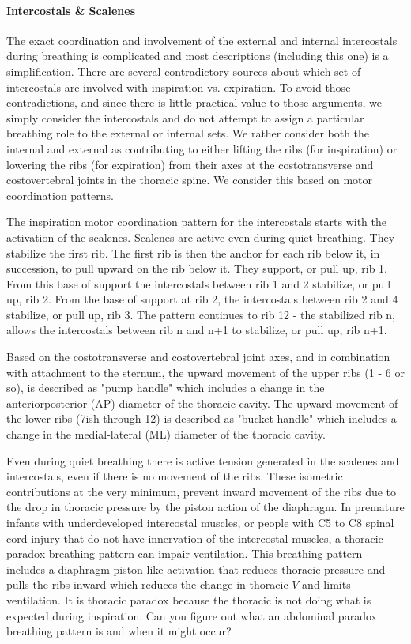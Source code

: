 \paragraph{Intercostals \& Scalenes}

The exact coordination and involvement of the external and internal intercostals during breathing is complicated and most descriptions (including this one) is a simplification. There are several contradictory sources about which set of intercostals are involved with inspiration vs. expiration. To avoid those contradictions, and since there is little practical value to those arguments, we simply consider the intercostals and do not attempt to assign a particular breathing role to the external or internal sets. We rather consider both the internal and external as contributing to either lifting the ribs (for inspiration) or lowering the ribs (for expiration) from their axes at the costotransverse and costovertebral joints in the thoracic spine. We consider this based on motor coordination patterns.

The inspiration motor coordination pattern for the intercostals starts with the activation of the scalenes. Scalenes are active even during quiet breathing. They stabilize the first rib. The first rib is then the anchor for each rib below it, in succession, to pull upward on the rib below it. They support, or pull up, rib 1. From this base of support the intercostals between rib 1 and 2 stabilize, or pull up, rib 2. From the base of support at rib 2, the intercostals between rib 2 and 4 stabilize, or pull up, rib 3. The pattern continues to rib 12 - the stabilized rib n, allows the intercostals between rib n and n+1 to stabilize, or pull up, rib n+1.

Based on the costotransverse and costovertebral joint axes, and in combination with attachment to the sternum, the upward movement of the upper ribs (1 - 6 or so), is described as "pump handle" which includes a change in the anteriorposterior (AP) diameter of the thoracic cavity. The upward movement of the lower ribs (7ish through 12) is described as "bucket handle" which includes a change in the medial-lateral (ML) diameter of the thoracic cavity.

Even during quiet breathing there is active tension generated in the scalenes and intercostals, even if there is no movement of the ribs. These isometric contributions at the very minimum, prevent inward movement of the ribs due to the drop in thoracic pressure by the piston action of the diaphragm. In premature infants with underdeveloped intercostal muscles, or people with C5 to C8 spinal cord injury that do not have innervation of the intercostal muscles, a thoracic paradox breathing pattern can impair ventilation. This breathing pattern includes a diaphragm piston like activation that reduces thoracic pressure and pulls the ribs inward which reduces the change in thoracic $V$ and limits ventilation. It is thoracic paradox because the thoracic is not doing what is expected during inspiration. Can you figure out what an abdominal paradox breathing pattern is and when it might occur?

